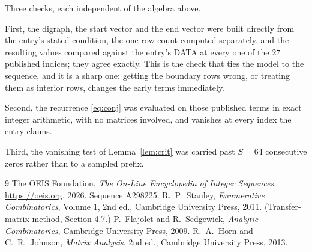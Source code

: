 \documentclass[11pt,a4paper]{article}
\theoremstyle{plain}
\theoremstyle{definition}
\begin{document}
Three checks, each independent of the algebra above.

First, the digraph, the start vector and the end vector were built directly from the
entry's stated condition, the one-row count computed separately, and the resulting values
compared against the entry's DATA at every one of the $27$ published indices; they
agree exactly. This is the check that ties the model to the sequence, and it is a sharp one:
getting the boundary rows wrong, or treating them as interior rows, changes the early terms
immediately.

Second, the recurrence \eqref{eq:conj} was evaluated on those published terms in exact
integer arithmetic, with no matrices involved, and vanishes at every index the entry claims.

Third, the vanishing test of Lemma~\ref{lem:crit} was carried past $S=64$ consecutive
zeros rather than to a sampled prefix.

\begin{thebibliography}{9}
 The OEIS Foundation, \emph{The On-Line Encyclopedia of Integer
Sequences}, \url{https://oeis.org}, 2026. Sequence A298225.
 R.~P.~Stanley, \emph{Enumerative Combinatorics}, Volume 1, 2nd ed.,
Cambridge University Press, 2011. (Transfer-matrix method, Section 4.7.)
 P.~Flajolet and R.~Sedgewick, \emph{Analytic Combinatorics}, Cambridge
University Press, 2009.
 R.~A.~Horn and C.~R.~Johnson, \emph{Matrix Analysis}, 2nd ed., Cambridge
University Press, 2013.
\end{thebibliography}
\end{document}
